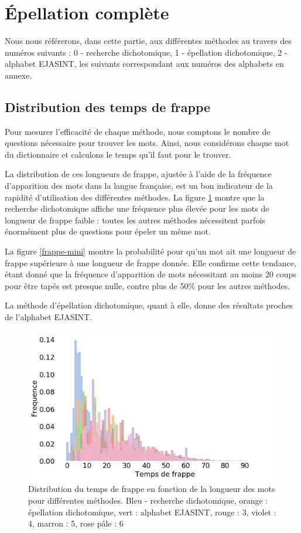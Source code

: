 \documentclass[twoside,twocolumn]{article}
\begin{document}

\section{Épellation complète}

Nous nous référerons, dans cette partie, aux différentes méthodes au travers des numéros suivants : 0 - recherche dichotomique, 1 - épellation dichotomique, 2 - alphabet EJASINT, les suivants correspondant aux numéros des alphabets en annexe.

\subsection{Distribution des temps de frappe}

Pour mesurer l'efficacité de chaque méthode, nous comptons le nombre de questions nécessaire pour trouver les mots. Ainsi, nous considérons chaque mot du dictionnaire et calculons le temps qu'il faut pour le trouver.

La distribution de ces longueurs de frappe, ajustée à l'aide de la fréquence d'apparition des mots dans la langue française, est un bon indicateur de la rapidité d'utilisation des différentes méthodes. La figure \ref{distrib} montre que la recherche dichotomique affiche une fréquence plus élevée pour les mots de longueur de frappe faible : toutes les autres méthodes nécessitent parfois énormément plus de questions pour épeler un même mot. 

La figure \ref{frappe-mini} montre la probabilité pour qu'un mot ait une longueur de frappe supérieure à une longueur de frappe donnée. Elle confirme cette tendance, étant donné que la fréquence d'apparition de mots nécessitant au moins 20 coups pour être tapés est presque nulle, contre plus de 50\% pour les autres méthodes.

La méthode d'épellation dichotomique, quant à elle, donne des résultats proches de l'alphabet EJASINT.
\begin{center}
\begin{figure}
  \includegraphics[scale=0.35]{distrib.png}
  \caption{Distribution du temps de frappe en fonction de la longueur des mots pour différentes méthodes. Bleu - recherche dichotomique, orange : épellation dichotomique, vert : alphabet EJASINT, rouge : 3, violet : 4, marron : 5, rose pâle : 6}
  \label{distrib}
\end{figure}
\end{center}
\end{document}

